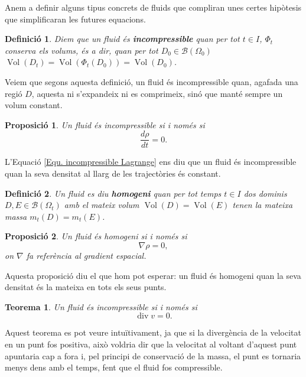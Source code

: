 \documentclass{article}
\numberwithin{equation}{section}
\DeclareMathOperator{\Vol}{Vol}
\DeclareMathOperator{\diver}{div}
\newtheorem{teorema}{Teorema}[section]
\newtheorem{definicio}{Definici\'{o}}[section]
\newtheorem{proposicio}{Proposici\'{o}}[section]
\begin{document}
Anem a definir alguns tipus concrets de fluids que compliran unes certes hip\`{o}tesis que simplificaran les futures equacions.

\begin{definicio}
Diem que un fluid \'{e}s \textbf{incompressible} quan per tot $t\in I$, $\Phi_t$ conserva els volums, \'{e}s a dir, quan per tot $D_0\in\mathcal{B}(\Omega_0)$ $\Vol(D_t)=\Vol(\Phi_t(D_0))=\Vol(D_0)$.
\end{definicio}

Veiem que segons aquesta definici\'{o}, un fluid \'{e}s incompressible quan, agafada una regi\'{o} $D$, aquesta ni s'expandeix ni es comprimeix, sin\'{o} que mant\'{e} sempre un volum constant.

\begin{proposicio}
Un fluid \'{e}s incompressible si i nom\'{e}s si
\begin{equation}\label{Equ. incompressible Lagrange}
\frac{d\rho}{dt}=0.
\end{equation}
\end{proposicio}

L'Equaci\'{o} \eqref{Equ. incompressible Lagrange} ens diu que un fluid \'{e}s incompressible quan la seva densitat al llarg de les traject\`{o}ries \'{e}s constant.

\begin{definicio}
Un fluid es diu \textbf{homogeni} quan per tot temps $t\in I$ dos dominis $D,E\in\mathcal{B}(\Omega_t)$ amb el mateix volum $\Vol(D)=\Vol(E)$ tenen la mateixa massa $m_t(D)=m_t(E)$.
\end{definicio}

\begin{proposicio}
Un fluid \'{e}s homogeni si i nom\'{e}s si
\begin{equation}
\nabla\rho=0,
\end{equation}
on $\nabla$ fa refer\`{e}ncia al gradient espacial.
\end{proposicio}

Aquesta proposici\'{o} diu el que hom pot esperar: un fluid \'{e}s homogeni quan la seva densitat \'{e}s la mateixa en tots els seus punts.

\begin{teorema}
Un fluid \'{e}s incompressible si i nom\'{e}s si
\begin{equation}
\diver v=0.
\end{equation}
\end{teorema}

Aquest teorema es pot veure intu\"{i}tivament, ja que si la diverg\`{e}ncia de la velocitat en un punt fos positiva, aix\`{o} voldria dir que la velocitat al voltant d'aquest punt apuntaria cap a fora i, pel principi de conservaci\'{o} de la massa, el punt es tornaria menys dens amb el temps, fent que el fluid fos compressible.
\end{document}

